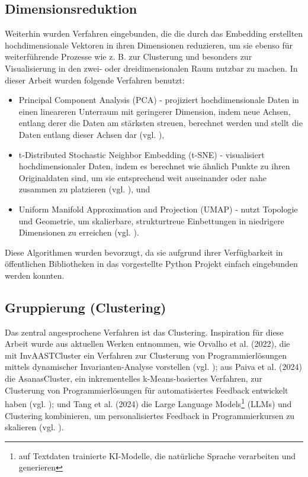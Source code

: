 \subsection{Dimensionsreduktion}
Weiterhin wurden Verfahren eingebunden, die die durch das Embedding erstellten hochdimensionale Vektoren in ihren Dimensionen reduzieren, um sie ebenso für weiterführende Prozesse wie z. B. zur Clusterung und besonders zur Visualisierung in den zwei- oder dreidimensionalen Raum nutzbar zu machen. In dieser Arbeit wurden folgende Verfahren benutzt:
\begin{itemize}
    \item Principal Component Analysis (PCA) - projiziert hochdimensionale Daten in einen lineareren Unterraum mit geringerer Dimension, indem neue Achsen, entlang derer die Daten am stärksten streuen, berechnet werden und stellt die Daten entlang dieser Achsen dar (vgl. \cite{KarlPearson.1901}),
    \item t-Distributed Stochastic Neighbor Embedding (t-SNE) - visualisiert hochdimensionaler Daten, indem es berechnet wie ähnlich Punkte zu ihren Originaldaten sind, um sie entsprechend weit auseinander oder nahe zusammen zu platzieren (vgl. \cite{LaurensvanderMaatenundGeoffreyHinton.2008}), und
    \item Uniform Manifold Approximation and Projection (UMAP) - nutzt Topologie und Geometrie, um skalierbare, strukturtreue Einbettungen in niedrigere Dimensionen zu erreichen (vgl. \cite{McInnes.09.02.2018}).
\end{itemize}
Diese Algorithmen wurden bevorzugt, da sie aufgrund ihrer Verfügbarkeit in öffentlichen Bibliotheken in das vorgestellte Python Projekt einfach eingebunden werden konnten.

\subsection{Gruppierung (Clustering)}
Das zentral angesprochene Verfahren ist das Clustering. Inspiration für diese Arbeit wurde aus aktuellen Werken entnommen, wie Orvalho et al. (2022), die mit InvAASTCluster ein Verfahren zur Clusterung von Programmierlösungen mittels dynamischer Invarianten-Analyse vorstellen (vgl. \cite{Orvalho.28.06.2022}); aus Paiva et al. (2024) die AsanasCluster, ein inkrementelles k-Means-basiertes Verfahren, zur Clusterung von Programmierlösungen für automatisiertes Feedback entwickelt haben (vgl. \cite{Paiva.2024}); und Tang et al. (2024) die Large Language Models\footnote{auf Textdaten trainierte KI-Modelle, die natürliche Sprache verarbeiten und generieren} (LLMs) und Clustering kombinieren, um personalisiertes Feedback in Programmierkursen zu skalieren (vgl. \cite{Tang.21.10.2024}).

